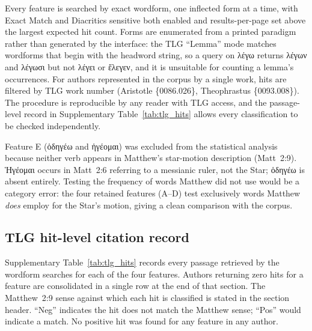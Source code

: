 \documentclass[11pt,a4paper]{article}
\newcommand{\grk}[1]{{\fontencoding{LGR}\selectfont #1}}
\newcommand{\grk}[1]{{\greekfont #1}}
\begin{document}
\noindent Every feature is searched by exact wordform, one inflected form at a
time, with \textsf{Exact Match} and \textsf{Diacritics sensitive} both enabled
and results-per-page set above the largest expected hit count. Forms are
enumerated from a printed paradigm rather than generated by the interface: the
TLG ``Lemma'' mode matches wordforms that begin with the headword string, so a
query on \grk{λέγω} returns \grk{λέγων} and \grk{λέγωσι} but not \grk{λέγει} or
\grk{ἔλεγεν}, and it is unsuitable for counting a lemma's occurrences. For
authors represented in the corpus by a single work, hits are filtered by TLG
work number (Aristotle \{0086.026\}, Theophrastus \{0093.008\}). The procedure
is reproducible by any reader with TLG access, and the passage-level record in
Supplementary Table~\ref{tab:tlg_hits} allows every classification to be checked independently.

\noindent Feature E (\grk{ὁδηγέω} and \grk{ἡγέομαι}) was excluded from the
statistical analysis because neither verb appears in Matthew's star-motion
description (Matt~2:9). \grk{Ἡγέομαι} occurs in Matt~2:6 referring to a
messianic ruler, not the Star; \grk{ὁδηγέω} is absent entirely.
Testing the frequency of words Matthew did not use would be a category
error: the four retained features (A--D) test exclusively words Matthew
\emph{does} employ for the Star's motion, giving a clean comparison with the
corpus.

\subsection{TLG hit-level citation record}
\label{subsec:tlg_hits}

Supplementary Table~\ref{tab:tlg_hits} records every passage retrieved by the wordform searches
for each of the four features. Authors returning zero hits for a feature are
consolidated in a single row at the end of that section. The Matthew~2:9
sense against which each hit is classified is stated in the section header.
``Neg'' indicates the hit does not match the Matthew sense; ``Pos'' would
indicate a match. No positive hit was found for any feature in any author.
\end{document}
